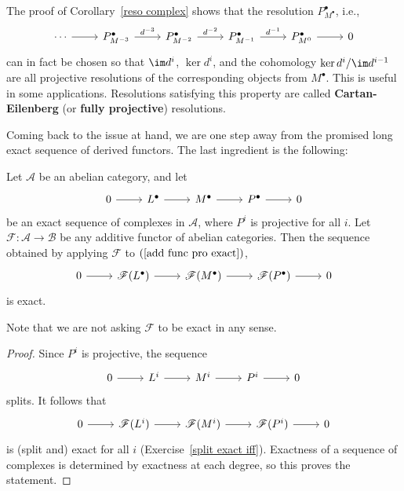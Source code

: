 \begin{remark}\label{reso comp remk}
The proof of Corollary~\ref{reso complex} shows that the resolution $P^\bullet_{M^\bullet}$, i.e.,
\[\begin{tikzcd}
\cdots\ar[r]&P^\bullet_{M^{-3}}\ar[r,"d^{-3}"]&P^\bullet_{M^{-2}}\ar[r,"d^{-2}"]&P^\bullet_{M^{-1}}\ar[r,"d^{-1}"]&P^\bullet_{M^{0}}\ar[r]&0
\end{tikzcd}\]
can in fact be chosen so that $\im d^i$, $\ker d^i$, and the cohomology $\ker d^i/\im d^{i-1}$ are
all projective resolutions of the corresponding objects from $M^\bullet$. This is useful in some applications. Resolutions satisfying this property are called \textbf{Cartan-Eilenberg} (or \textbf{fully projective}) resolutions.
\end{remark}
Coming back to the issue at hand, we are one step away from the promised long exact sequence of derived functors. The last ingredient is the following:
\begin{lemma}\label{add func pro exact}
Let $\mathcal{A}$ be an abelian category, and let
\begin{equation}\label{add func pro exact-1}
\begin{tikzcd}
0\ar[r]&L^\bullet\ar[r]&M^\bullet\ar[r]&P^\bullet\ar[r]&0
\end{tikzcd}
\end{equation}
be an exact sequence of complexes in $\mathcal{A}$, where $P^i$ is projective for all $i$. Let $\mathscr{F}:\mathcal{A}\to\mathcal{B}$ be any additive functor of abelian categories. Then the sequence obtained by applying $\mathscr{F}$ to $(\ref{add func pro exact})$,
\[\begin{tikzcd}
0\ar[r]&\mathscr{F}(L^\bullet)\ar[r]&\mathscr{F}(M^\bullet)\ar[r]&\mathscr{F}(P^\bullet)\ar[r]&0
\end{tikzcd}\]
is exact.
\end{lemma}
Note that we are not asking $\mathscr{F}$ to be exact in any sense.
\begin{proof}
Since $P^i$ is projective, the sequence
\[\begin{tikzcd}
0\ar[r]&L^i\ar[r]&M^i\ar[r]&P^i\ar[r]&0
\end{tikzcd}\]
splits. It follows that
\[\begin{tikzcd}
0\ar[r]&\mathscr{F}(L^i)\ar[r]&\mathscr{F}(M^i)\ar[r]&\mathscr{F}(P^i)\ar[r]&0
\end{tikzcd}\]
is (split and) exact for all $i$ (Exercise~\ref{split exact iff}). Exactness of a sequence of complexes is determined by exactness at each degree, so this proves the statement.
\end{proof}
